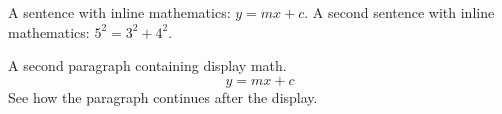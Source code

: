 \documentclass{article}
\begin{document}
	A sentence with inline mathematics: $y = mx + c$.
	A second sentence with inline mathematics: $5^{2} = 3^{2} + 4^{2}$.
	
	A second paragraph containing display math.
	\[
	y = mx + c
	\]
	See how the paragraph continues after the display.
\end{document}
